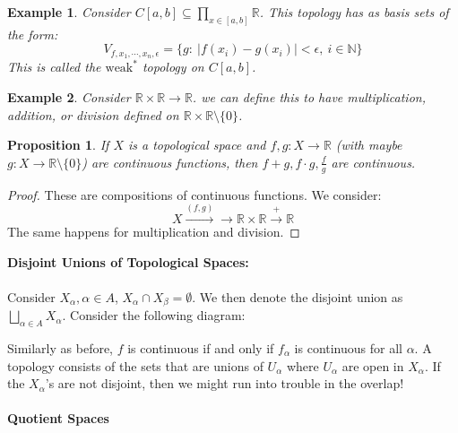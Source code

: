 \documentclass{article}
\newcommand{\R}{\mathbb{R}}
\newcommand{\N}{\mathbb{N}}
\newtheorem{example}{Example}
\newtheorem{proposition}{Proposition}
\begin{document}
\begin{example}
Consider $C[a,b]\subseteq\displaystyle\prod_{x\in[a,b]}\R$. This topology has as basis sets of the form:
$$V_{f,x_1,\cdots, x_n,\epsilon}=\{g:\ |f(x_i)-g(x_i)|<\epsilon,\ i\in\N\}$$
This is called the $\text{weak}^*$ topology on $C[a,b]$.
\end{example}
\begin{example}
Consider $\R\times\R\rightarrow\R$. we can define this to have multiplication, addition, or division defined on $\R\times \R\setminus\{0\}$.
\end{example}
\begin{proposition}
If $X$ is a topological space and $f,g:X\rightarrow \R$ (with maybe $g:X\rightarrow \R\setminus\{0\}$) are continuous functions, then $f+g, f\cdot g, \frac{f}{g}$ are continuous.
\end{proposition}
\begin{proof}
These are compositions of continuous functions. We consider:
$$X\xrightarrow{(f,g)}\rightarrow \R\times\R\xrightarrow{+}\R$$
The same happens for multiplication and division.
\end{proof}
\noindent\textbf{Disjoint Unions of Topological Spaces:}\\
\\
Consider $X_\alpha, \alpha\in A$, $X_\alpha\cap X_\beta=\emptyset$. We then denote the disjoint union as $\displaystyle\bigsqcup_{\alpha\in A}X_\alpha$. Consider the following diagram: 
\begin{center}
\end{center}
Similarly as before, $f$ is continuous if and only if $f_\alpha$ is continuous for all $\alpha$. A topology consists of the sets that are unions of $U_\alpha$ where $U_\alpha$ are open in $X_\alpha$. If the $X_\alpha$'s are not disjoint, then we might run into trouble in the overlap!
\\
\\
\noindent\textbf{Quotient Spaces}
\end{document}
